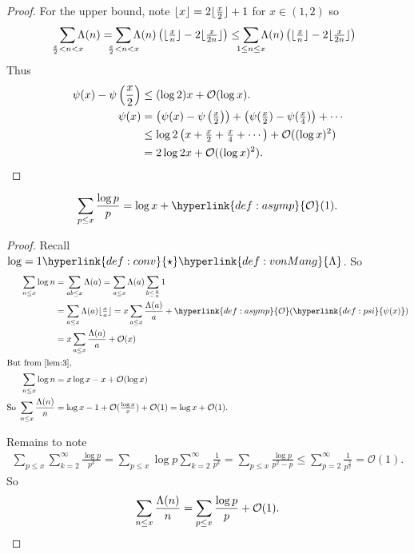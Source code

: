 \documentclass{article}
\newcommand{\1}{\mathbbm{1}}
\newcommand{\bigO}{\mathcal{O}}
\DeclarePairedDelimiter\floor{\lfloor}{\rfloor}
\begin{document}
\begin{proof}
  For the upper bound, note $\floor{x} = 2 \floor{\frac{x}{2}} + 1$ for $x \in (1,2)$ so
  \begin{equation*}
    \sum_{\mathclap{\frac{x}{2} < n < x}} \Lambda(n) = \sum_{\mathclap{\frac{x}{2} < n < x}} \Lambda(n) \left(\floor{\tfrac{x}{n}} - 2 \floor{\tfrac{x}{2n}}\right) \leq \sum_{\mathclap{1 \leq n \leq x}} \Lambda(n) \left(\floor{\tfrac{x}{n}} - 2 \floor{\tfrac{x}{2n}}\right)
  \end{equation*}
  Thus
  \begin{align*}
    \psi(x) - \psi\left(\frac{x}{2}\right) &\leq (\log 2) x + \bigO(\log x). \\
    \psi(x) &= \left(\psi(x) - \psi\left(\tfrac{x}{2}\right)\right) + \left(\psi(\tfrac{x}{2}) - \psi(\tfrac{x}{4})\right) + \dotsb  \\
            &\leq \log 2\left(x + \tfrac{x}{2} + \tfrac{x}{4} + \dotsb\right) + \bigO((\log x)^2)\\
    &= 2 \log 2 x + \bigO((\log x)^2). \qedhere
  \end{align*}
\end{proof}
\begin{nlemma}\label{lem:7}
  \begin{equation*}
    \sum_{p \leq x} \frac{\log p}{p} = \log x + \hyperlink{def:asymp}{\bigO}(1).
  \end{equation*}
\end{nlemma}
\begin{proof}
  Recall $\log = 1 \hyperlink{def:conv}{\star} \hyperlink{def:vonMang}{\Lambda}$. So
  \begin{align*}
    \sum_{n \leq x} \log n &= \sum_{ab \leq x} \Lambda(a) = \sum_{a \leq x} \Lambda(a) \sum_{b \leq \frac{x}{a}} 1 \\
                           &= \sum_{a \leq x} \Lambda(a) \floor{\tfrac{x}{a}} = x \sum_{a \leq x} \frac{\Lambda(a)}{a} + \hyperlink{def:asymp}{\bigO}(\hyperlink{def:psi}{\psi(x)}) \\
                           &= x \sum_{a \leq x} \frac{\Lambda(a)}{a} + \bigO(x) \\
  \shortintertext{But from \cref{lem:3},}
    \sum_{n \leq x} \log n &= x \log x - x + \bigO(\log x) \\
    \text{So }\sum_{n \leq x} \frac{\Lambda(n)}{n} &= \log x - 1 + \mathcal{O}(\tfrac{\log x}{x}) + \bigO(1) = \log x + \bigO(1).
  \end{align*}

  Remains to note
  \begin{align*}
    \sum_{p \leq x} \sum_{k=2}^\infty \frac{\log p}{p^k} = \sum_{p \leq x} \log p \sum_{k=2}^\infty \frac{1}{p^k} = \sum_{p \leq x} \frac{\log p}{p^2 - p} \leq \sum_{p=2}^\infty \frac{1}{p^{\frac{3}{2}}} = \bigO(1).
  \end{align*}
  So
  \begin{equation*}\sum_{n \leq x} \frac{\Lambda(n)}n = \sum_{p \leq x} \frac{\log p}{p} + \bigO(1).\qedhere\end{equation*}
\end{proof}
\end{document}
